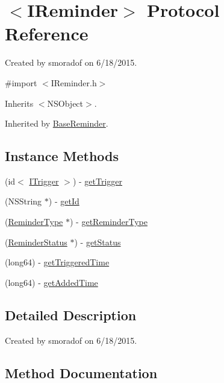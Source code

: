 \hypertarget{protocol_i_reminder-p}{}\section{$<$I\+Reminder$>$ Protocol Reference}
\label{protocol_i_reminder-p}


Created by smoradof on 6/18/2015.  




{\ttfamily \#import $<$I\+Reminder.\+h$>$}



Inherits $<$\+N\+S\+Object$>$.



Inherited by \hyperlink{interface_base_reminder}{Base\+Reminder}.

\subsection*{Instance Methods}
\begin{DoxyCompactItemize}
\item 
(id$<$ \hyperlink{protocol_i_trigger-p}{I\+Trigger} $>$) -\/ \hyperlink{protocol_i_reminder-p_aada6cf3b1f9d765243d5b8a666065477}{get\+Trigger}
\item 
(N\+S\+String $\ast$) -\/ \hyperlink{protocol_i_reminder-p_a761163937af463373aeaa34cbe88cb7d}{get\+Id}
\item 
(\hyperlink{interface_reminder_type}{Reminder\+Type} $\ast$) -\/ \hyperlink{protocol_i_reminder-p_a8c5bb51af2763d90d73ddf45d41e6f81}{get\+Reminder\+Type}
\item 
(\hyperlink{interface_reminder_status}{Reminder\+Status} $\ast$) -\/ \hyperlink{protocol_i_reminder-p_a0bdcf4886f5f7c01f27f75bad5ca5e3a}{get\+Status}
\item 
(long64) -\/ \hyperlink{protocol_i_reminder-p_a0f41cce9325693cf871bd317d77ebf7d}{get\+Triggered\+Time}
\item 
(long64) -\/ \hyperlink{protocol_i_reminder-p_a8cf9d587047b3c98eccb0c14c04e055c}{get\+Added\+Time}
\end{DoxyCompactItemize}


\subsection{Detailed Description}
Created by smoradof on 6/18/2015. 

\subsection{Method Documentation}
\hypertarget{protocol_i_reminder-p_a8cf9d587047b3c98eccb0c14c04e055c}{}
